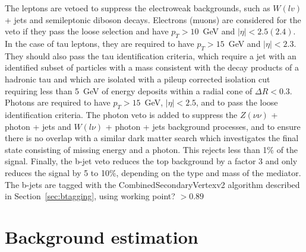 The leptons are vetoed to suppress the electroweak backgrounds, such as $W(lv)$ + jets and semileptonic diboson decays. Electrons (muons) are considered for the veto if they pass the loose selection and have $p_T > 10$~GeV and $|\eta| < 2.5 (2.4)$. In the case of tau leptons, they are required to have $p_T > 15$~GeV and $|\eta| < 2.3$. They should also pass the tau identification criteria, which require a jet with an identified subset of particles with a mass consistent with the decay products of a hadronic tau and which are isolated with a pileup corrected isolation cut requiring less than 5~GeV of energy deposits within a radial cone of $\Delta R < 0.3$. Photons are required to have $p_T > 15$~GeV, $|\eta| < 2.5$, and to pass the {\color{red}loose identification} criteria. The photon veto is added to suppress the $Z(\nu\nu)$ + photon + jets and $W(l\nu)$ + photon + jets background processes, and to ensure there is no overlap with a similar dark matter search which investigates the final state consisting of missing energy and a photon. This rejects less than 1\% of the signal. Finally, the b-jet veto reduces the top background by a factor 3 and only reduces the signal by 5 to 10\%, depending on the type and mass of the mediator. The b-jets are tagged with the CombinedSecondaryVertexv2 algorithm described in Section~\ref{sec:btagging}, using {\color{red} working point? $> 0.89$}

\section{Background estimation}
\label{sec:bkgd}

% 
% 
% 
% 

